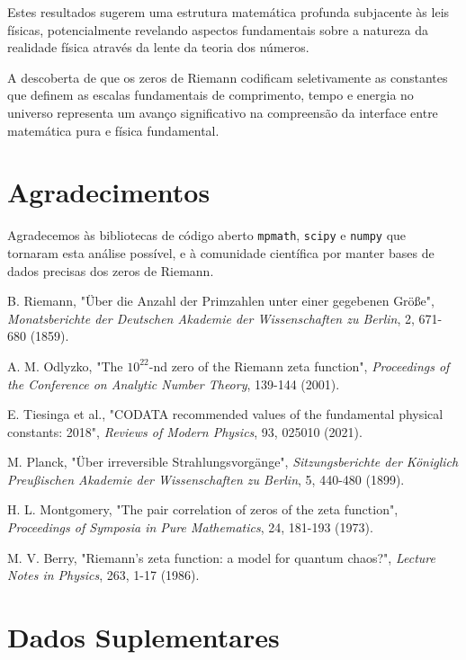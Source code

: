 \documentclass[11pt,a4paper]{article}
\begin{document}
Estes resultados sugerem uma estrutura matemática profunda subjacente às leis físicas, potencialmente revelando aspectos fundamentais sobre a natureza da realidade física através da lente da teoria dos números.

A descoberta de que os zeros de Riemann codificam seletivamente as constantes que definem as escalas fundamentais de comprimento, tempo e energia no universo representa um avanço significativo na compreensão da interface entre matemática pura e física fundamental.

\section*{Agradecimentos}
Agradecemos às bibliotecas de código aberto \texttt{mpmath}, \texttt{scipy} e \texttt{numpy} que tornaram esta análise possível, e à comunidade científica por manter bases de dados precisas dos zeros de Riemann.

\begin{thebibliography}{99}

B. Riemann, "Über die Anzahl der Primzahlen unter einer gegebenen Größe", 
\textit{Monatsberichte der Deutschen Akademie der Wissenschaften zu Berlin}, 2, 671-680 (1859).

A. M. Odlyzko, "The $10^{22}$-nd zero of the Riemann zeta function", 
\textit{Proceedings of the Conference on Analytic Number Theory}, 139-144 (2001).

E. Tiesinga et al., "CODATA recommended values of the fundamental physical constants: 2018", 
\textit{Reviews of Modern Physics}, 93, 025010 (2021).

M. Planck, "Über irreversible Strahlungsvorgänge", 
\textit{Sitzungsberichte der Königlich Preußischen Akademie der Wissenschaften zu Berlin}, 5, 440-480 (1899).

H. L. Montgomery, "The pair correlation of zeros of the zeta function", 
\textit{Proceedings of Symposia in Pure Mathematics}, 24, 181-193 (1973).

M. V. Berry, "Riemann's zeta function: a model for quantum chaos?", 
\textit{Lecture Notes in Physics}, 263, 1-17 (1986).

\end{thebibliography}

\appendix

\section{Dados Suplementares}
\end{document}
